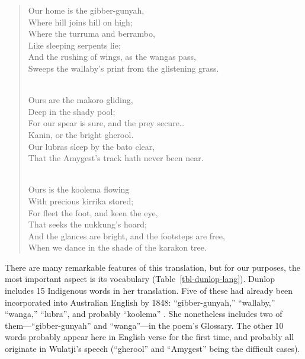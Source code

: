 \documentclass[
  Crown,
  times,
  sageh]{sagej}
\begin{document}
\begin{quote}
Our home is the gibber-gunyah,\\
Where hill joins hill on high;\\
Where the turruma and berrambo,\\
Like sleeping serpents lie;\\
And the rushing of wings, as the wangas pass,\\
Sweeps the wallaby's print from the glistening grass.\\
\strut \\
Ours are the makoro gliding,\\
Deep in the shady pool;\\
For our spear is sure, and the prey secure\ldots{}\\
Kanin, or the bright gherool.\\
Our lubras sleep by the bato clear,\\
That the Amygest's track hath never been near.\\
\strut \\
Ours is the koolema flowing\\
With precious kirrika stored;\\
For fleet the foot, and keen the eye,\\
That seeks the nukkung's hoard;\\
And the glances are bright, and the footsteps are free,\\
When we dance in the shade of the karakon tree.
\end{quote}

There are many remarkable features of this translation, but for our
purposes, the most important aspect is its vocabulary
(Table~\ref{tbl-dunlop-lang}). Dunlop includes 15 Indigenous words in
her translation. Five of these had already been incorporated into
Australian English by 1848: ``gibber-gunyah,'' ``wallaby,'' ``wanga,''
``lubra'', and probably ``koolema'' \citep{dixon_australian_2006}. She
nonetheless includes two of them---``gibber-gunyah'' and ``wanga''---in
the poem's Glossary. The other 10 words probably appear here in English
verse for the first time, and probably all originate in Wulatji's speech
(``gherool'' and ``Amygest'' being the difficult cases).
\end{document}
